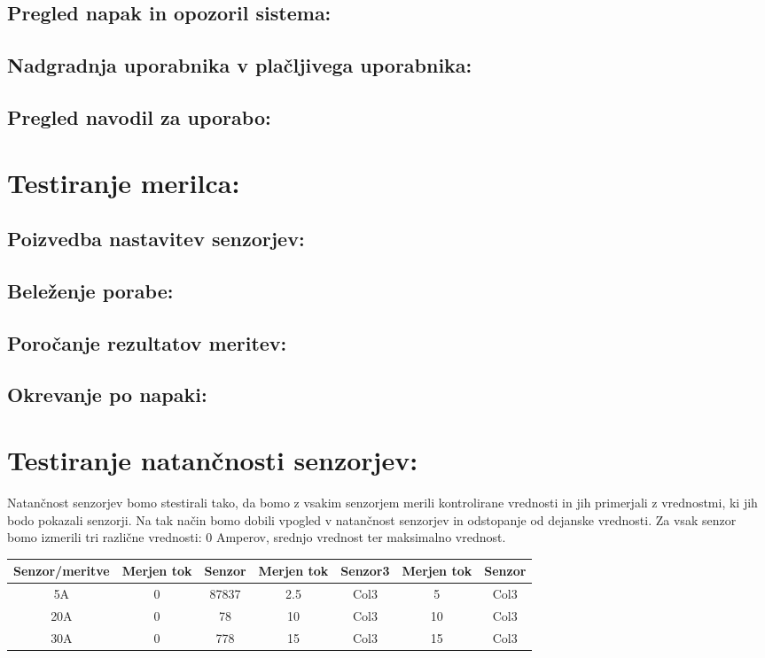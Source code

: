 \documentclass[12pt,a4paper,titlepage,openany]{report}
\begin{document}
\subsection{Pregled napak in opozoril sistema:}
\subsection{Nadgradnja uporabnika v plačljivega uporabnika:}
\subsection{Pregled navodil za uporabo:}

\section{Testiranje merilca:}
\thispagestyle{fancy}


\subsection{Poizvedba nastavitev senzorjev:}
\subsection{Beleženje porabe:}
\subsection{Poročanje rezultatov meritev:}
\subsection{Okrevanje po napaki:}


\section{Testiranje natančnosti senzorjev:}
\thispagestyle{fancy}

Natančnost senzorjev bomo stestirali tako, da bomo z vsakim senzorjem merili kontrolirane vrednosti in jih primerjali z vrednostmi, ki jih bodo pokazali senzorji. Na tak način bomo dobili vpogled v natančnost senzorjev in odstopanje od dejanske vrednosti. Za vsak senzor bomo izmerili tri različne vrednosti: 0 Amperov, srednjo vrednost ter maksimalno vrednost.



\begin{table}[h!]
\centering
 \begin{tabular}{| c || c c | c  c | c c |} 
 \hline
 Senzor/meritve &  Merjen tok & Senzor & Merjen tok & Senzor3 & Merjen tok  & Senzor\\ [0.5ex] 
 \hline\hline
 5A & 0 & 87837 & 2.5 & Col3 & 5 & Col3 \\ 
 20A & 0 & 78 & 10 & Col3 & 10 & Col3 \\
 30A & 0 & 778 & 15 & Col3 & 15 & Col3\\[1ex] 
 \hline
 \end{tabular}
\end{table}
\end{document}
